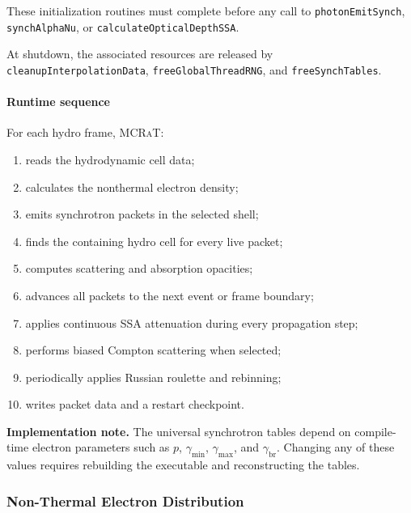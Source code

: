 \documentclass[12pt,a4paper]{article}
\newcommand{\code}[1]{\texttt{#1}}
\newcommand{\mcrat}{\textsc{MCRaT}}
\newenvironment{implementationnote}{%
	\begin{framed}\noindent\textbf{Implementation note.}\quad}
	{\end{framed}}
\begin{document}
These initialization routines must complete before any call to
\code{photonEmitSynch}, \code{synchAlphaNu}, or
\code{calculateOpticalDepthSSA}.

At shutdown, the associated resources are released by
\code{cleanupInterpolationData}, \code{freeGlobalThreadRNG}, and
\code{freeSynchTables}.

\paragraph{Runtime sequence}

For each hydro frame, \mcrat{}:
\begin{enumerate}
	\item reads the hydrodynamic cell data;
	\item calculates the nonthermal electron density;
	\item emits synchrotron packets in the selected shell;
	\item finds the containing hydro cell for every live packet;
	\item computes scattering and absorption opacities;
	\item advances all packets to the next event or frame boundary;
	\item applies continuous SSA attenuation during every propagation
	step;
	\item performs biased Compton scattering when selected;
	\item periodically applies Russian roulette and rebinning;
	\item writes packet data and a restart checkpoint.
\end{enumerate}

\begin{implementationnote}
	The universal synchrotron tables depend on compile-time electron
	parameters such as \(p\), \(\gamma_{\min}\), \(\gamma_{\max}\), and
	\(\gamma_{\mathrm{br}}\). Changing any of these values requires rebuilding
	the executable and reconstructing the tables.
\end{implementationnote}

\subsubsection{Non-Thermal Electron Distribution}
\label{sec:electrons}
\end{document}

